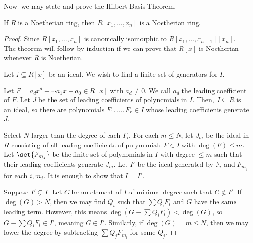 \documentclass[10pt]{mypackage}
\begin{document}
Now, we may state and prove the Hilbert Basis Theorem.
\begin{theorem}
  If $R$ is a Noetherian ring, then $R\left[ x_1,\dots,x_n \right]$ is a Noetherian ring.
\end{theorem}
\begin{proof}
  Since $R\left[ x_1,\dots,x_n \right]$ is canonically isomorphic to $R\left[ x_1,\dots,x_{n-1} \right]\left[ x_n \right]$. The theorem will follow by induction if we can prove that $R\left[ x \right]$ is Noetherian whenever $R$ is Noetherian.\newline

  Let $I\subseteq R\left[ x \right]$ be an ideal. We wish to find a finite set of generators for $I$.\newline

  Let $F = a_dx^d + \cdots a_1x + a_0\in R\left[ x \right]$ with $a_d\neq 0$. We call $a_d$ the leading coefficient of $F$. Let $J$ be the set of leading coefficients of polynomials in $I$. Then, $J\subseteq R$ is an ideal, so there are polynomials $F_1,\dots,F_r\in I$ whose leading coefficients generate $J$.\newline

  Select $N$ larger than the degree of each $F_i$. For each $m\leq N$, let $J_m$ be the ideal in $R$ consisting of all leading coefficients of polynomials $F\in I$ with $\deg\left( F \right) \leq m$. Let $\set{F_{m_j}}$ be the finite set of polynomials in $I$ with degree $\leq m$ such that their leading coefficients generate $J_m$. Let $I'$ be the ideal generated by $F_i$ and $F_{m_j}$ for each $i,m_j$. It is enough to show that $I = I'$.\newline

  Suppose $I'\subsetneq I$. Let $G$ be an element of $I$ of minimal degree such that $G\notin I'$. If $\deg(G) > N$, then we may find $Q_i$ such that $\sum Q_iF_i$ and $G$ have the same leading term. However, this means $\deg\left( G - \sum Q_iF_i \right) < \deg(G)$, so $G - \sum Q_iF_i\in I'$, meaning $G\in I'$. Similarly, if $\deg\left( G \right) = m \leq N$, then we may lower the degree by subtracting $\sum Q_jF_{m_j}$ for some $Q_j$.
\end{proof}
\end{document}
